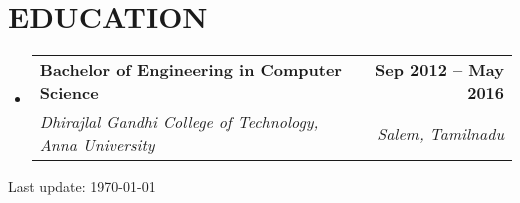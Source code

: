 \documentclass[letterpaper,11pt]{article}
\makeatletter
\newcommand{\resumeSubheading}[4]{
  \vspace{-2pt}\item
    \begin{tabular*}{1.0\textwidth}[t]{l@{\extracolsep{\fill}}r}
      \textbf{#1} & \textbf{\small #2} \\
      \textit{\small#3} & \textit{\small #4} \\
    \end{tabular*}\vspace{-7pt}
}
\newcommand{\resumeSubHeadingListStart}{\begin{itemize}[leftmargin=0.0in, label={}]}
\newcommand{\resumeSubHeadingListEnd}{\end{itemize}}
\makeatother
\begin{document}
\section{EDUCATION}
  \resumeSubHeadingListStart
    \resumeSubheading
      {Bachelor of Engineering in Computer Science }{Sep 2012 -- May 2016}
      {Dhirajlal Gandhi College of Technology, Anna University}{Salem, Tamilnadu}
  \resumeSubHeadingListEnd
  
\vspace{200pt} %
\begin{center}
    Last update: \today
\end{center}
     
\end{document}
